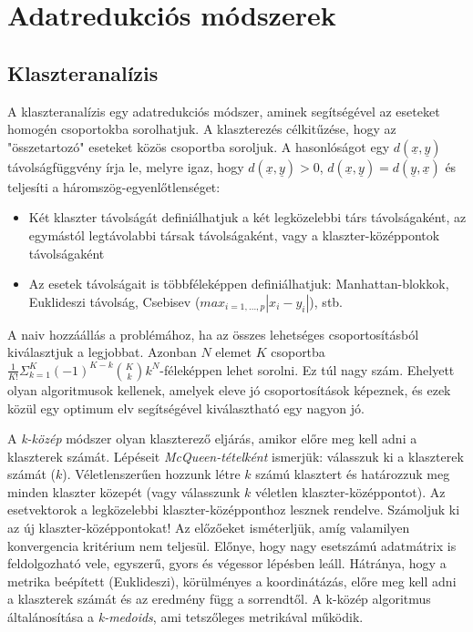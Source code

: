 \chapter{Adatredukciós módszerek}

\section{Klaszteranalízis}

A klaszteranalízis egy adatredukciós módszer, aminek segítségével az eseteket homogén csoportokba sorolhatjuk. A klaszterezés célkitűzése, hogy az "összetartozó" eseteket közös csoportba soroljuk. A hasonlóságot egy $d(\underline{x},\underline{y} )$ távolságfüggvény írja le, melyre igaz, hogy $d(\underline{x},\underline{y}) > 0$, $d(\underline{x},\underline{y})= d(\underline{y},\underline{x} )$ és teljesíti a háromszög-egyenlőtlenséget:
\begin{itemize}
\item Két klaszter távolságát definiálhatjuk a két legközelebbi társ távolságaként, az egymástól legtávolabbi társak távolságaként, vagy a klaszter-középpontok távolságaként
\item Az esetek távolságait is többféleképpen definiálhatjuk: Manhattan-blokkok, Euklideszi távolság, Csebisev ($max_{i=1,...,p} | x_i - y_i|$), stb.
\end{itemize}

A naiv hozzáállás a problémához, ha az összes lehetséges csoportosításból kiválasztjuk a legjobbat. Azonban $N$ elemet $K$ csoportba $\frac{1}{K!}\Sigma_{k=1}^K (-1)^{K-k} {{K}\choose{k}} k^N$-féleképpen lehet sorolni. Ez túl nagy szám. Ehelyett olyan algoritmusok kellenek, amelyek eleve jó csoportosítások képeznek, és ezek közül egy optimum elv segítségével kiválasztható egy nagyon jó.

A \emph{k-közép} módszer olyan klaszterező eljárás, amikor előre meg kell adni a klaszterek számát. Lépéseit \emph{McQueen-tételként} ismerjük: válasszuk ki a klaszterek számát ($k$). Véletlenszerűen hozzunk létre $k$ számú klasztert és határozzuk meg minden klaszter közepét (vagy válasszunk $k$ véletlen klaszter-középpontot).
Az esetvektorok a legközelebbi klaszter-középponthoz lesznek rendelve. Számoljuk ki az új klaszter-középpontokat! Az előzőeket isméterljük, amíg valamilyen konvergencia kritérium nem teljesül. Előnye, hogy nagy esetszámú adatmátrix is feldolgozható vele, egyszerű, gyors és végessor lépésben leáll. Hátránya, hogy a metrika beépített (Euklideszi), körülményes a koordinátázás, előre meg kell adni a klaszterek számát és az eredmény függ a sorrendtől.  A k-közép algoritmus általánosítása a \emph{k-medoids}, ami tetszőleges metrikával működik.

